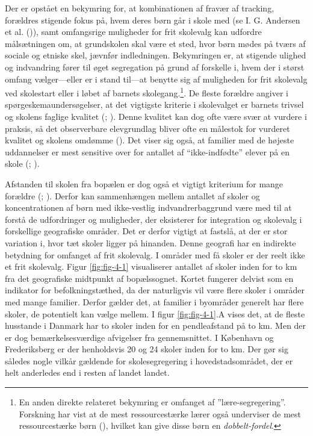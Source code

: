 \documentclass[
]{book}
\begin{document}
Der er opstået en bekymring for, at kombinationen af fravær af tracking, forældres stigende fokus på, hvem deres børn går i skole med (se I. G. Andersen et al. ()), samt omfangsrige muligheder for frit skolevalg kan udfordre målsætningen om, at grundskolen skal være et sted, hvor børn mødes på tværs af sociale og etniske skel, jævnfør indledningen. Bekymringen er, at stigende ulighed og indvandring fører til øget segregation på grund af forskelle i, hvem der i størst omfang vælger---eller er i stand til---at benytte sig af muligheden for frit skolevalg ved skolestart eller i løbet af barnets skolegang.\footnote{En anden direkte relateret bekymring er omfanget af ''lære-segregering''. Forskning har vist at de mest ressourcestærke lærer også underviser de mest ressourcestærke børn (), hvilket kan give disse børn en \emph{dobbelt-fordel}.}. De fleste forældre angiver i spørgeskemaundersøgelser, at det vigtigste kriterie i skolevalget er barnets trivsel og skolens faglige kvalitet (; ). Denne kvalitet kan dog ofte være svær at vurdere i praksis, så det observerbare elevgrundlag bliver ofte en målestok for vurderet kvalitet og skolens omdømme (). Det viser sig også, at familier med de højeste uddannelser er mest sensitive over for antallet af ``ikke-indfødte'' elever på en skole (; ).

Afstanden til skolen fra bopælen er dog også et vigtigt kriterium for mange forældre (; ). Derfor kan sammenhængen mellem antallet af skoler og koncentrationen af børn med ikke-vestlig indvandrerbaggrund være med til at forstå de udfordringer og muligheder, der eksisterer for integration og skolevalg i forskellige geografiske områder. Det er derfor vigtigt at fastslå, at der er stor variation i, hvor tæt skoler ligger på hinanden. Denne geografi har en indirekte betydning for omfanget af frit skolevalg. I områder med få skoler er der reelt ikke et frit skolevalg. Figur \ref{fig:fig-4-1} visualiserer antallet af skoler inden for to km fra det geografiske midtpunkt af bopælssognet. Kortet fungerer delvist som en indikator for befolkningstæthed, da der naturligvis vil være flere skoler i områder med mange familier. Derfor gælder det, at familier i byområder generelt har flere skoler, de potentielt kan vælge mellem. I figur \ref{fig:fig-4-1}.A vises det, at de fleste husstande i Danmark har to skoler inden for en pendleafstand på to km. Men der er dog bemærkelsesværdige afvigelser fra gennemsnittet. I København og Frederiksberg er der henholdsvis 20 og 24 skoler inden for to km. Der gør sig således nogle vilkår gældende for skolesegregering i hovedstadsområdet, der er helt anderledes end i resten af landet landet.
\end{document}
